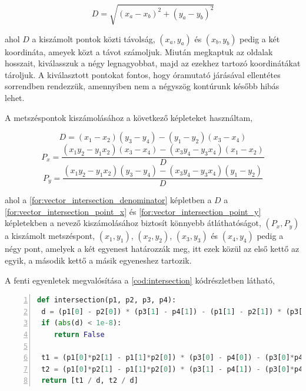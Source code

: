 \begin{equation}
    D = \sqrt{(x_a-x_b)^2 + (y_a-y_b)^2}
    \label{for:vector_distance}
\end{equation}

\par ahol $D$ a kiszámolt pontok közti távolság, $(x_a,y_a)$ és $(x_b,y_b)$ pedig a két koordináta, ameyek közt a távot számoljuk. Miután megkaptuk az oldalak hosszait, kiválasszuk a négy legnagyobbat, majd az ezekhez tartozó koordinátákat tároljuk. A kiválasztott pontokat fontos, hogy óramutató járásával ellentétes sorrendben rendezzük, amennyiben nem a négyszög kontúrunk később hibás lehet.
\par A metszéspontok kiszámolásához a következő képleteket \cite{line_line} használtam,

\begin{equation}
    D = (x_1 - x_2)(y_3 - y_4) - (y_1 - y_2)(x_3 - x_4)
    \label{for:vector_intersection_denominator}
\end{equation}
\begin{equation}
    P_x = \frac{(x_1y_2 - y_1x_2)(x_3 - x_4) - (x_3y_4 - y_3x_4)(x_1 - x_2)}{D}
    \label{for:vector_intersection_point_x}
\end{equation}
\begin{equation}
    P_y = \frac{(x_1y_2 - y_1x_2)(y_3 - y_4) - (x_3y_4 - y_3x_4)(y_1 - y_2)}{D}
    \label{for:vector_intersection_point_y}
\end{equation}

\par ahol a \ref{for:vector_intersection_denominator} képletben a $D$ a \ref{for:vector_intersection_point_x} és \ref{for:vector_intersection_point_y} képletekben a nevező kiszámolásához biztosít könnyebb átláthatóságot, $(P_x, P_y)$ a kiszámolt metszéspont, $(x_1, y_1)$, $(x_2, y_2)$, $(x_3, y_3)$ és $(x_4, y_4)$ pedig a négy pont, amelyek a két egyenest határozzák meg, itt ezek közül az első kettő az egyik, a második kettő a másik egyeneshez tartozik.
\par A fenti egyenletek megvalósítása a \ref{cod:intersection} kódrészletben látható,

\vspace{2mm}
\hspace{-10mm}
\begin{minipage}{\linewidth}
\begin{lstlisting}[language=Python, numbers=left, caption={Metszéspont kereső algoritmus.}, label={cod:intersection}]
def intersection(p1, p2, p3, p4):
 d = (p1[0] - p2[0]) * (p3[1] - p4[1]) - (p1[1] - p2[1]) * (p3[0] - p4[0])
 if (abs(d) < 1e-8):
    return False

 t1 = (p1[0]*p2[1] - p1[1]*p2[0]) * (p3[0] - p4[0]) - (p3[0]*p4[1] - p3[1]*p4[0]) * (p1[0] - p2[0])
 t2 = (p1[0]*p2[1] - p1[1]*p2[0]) * (p3[1] - p4[1]) - (p3[0]*p4[1] - p3[1]*p4[0]) * (p1[1] - p2[1])
 return [t1 / d, t2 / d]
\end{lstlisting}
\end{minipage}

